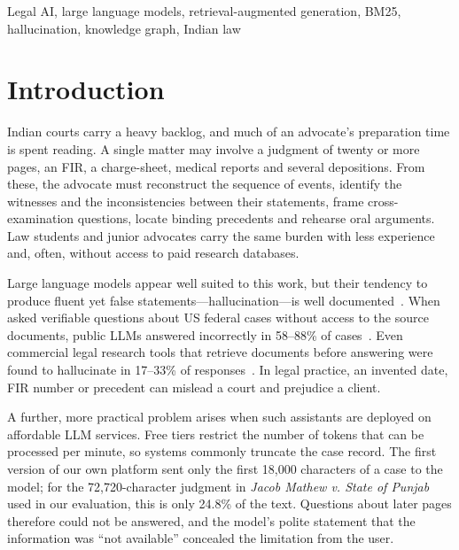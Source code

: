 \documentclass[conference]{IEEEtran}
\begin{document}
\begin{IEEEkeywords}
Legal AI, large language models, retrieval-augmented generation, BM25, hallucination, knowledge graph, Indian law
\end{IEEEkeywords}

\section{Introduction}
Indian courts carry a heavy backlog, and much of an advocate's preparation time is spent reading. A single matter may involve a judgment of twenty or more pages, an FIR, a charge-sheet, medical reports and several depositions. From these, the advocate must reconstruct the sequence of events, identify the witnesses and the inconsistencies between their statements, frame cross-examination questions, locate binding precedents and rehearse oral arguments. Law students and junior advocates carry the same burden with less experience and, often, without access to paid research databases.

Large language models appear well suited to this work, but their tendency to produce fluent yet false statements---hallucination---is well documented~\cite{ji2023survey}. When asked verifiable questions about US federal cases without access to the source documents, public LLMs answered incorrectly in 58--88\% of cases~\cite{dahl2024}. Even commercial legal research tools that retrieve documents before answering were found to hallucinate in 17--33\% of responses~\cite{magesh2025}. In legal practice, an invented date, FIR number or precedent can mislead a court and prejudice a client.

A further, more practical problem arises when such assistants are deployed on affordable LLM services. Free tiers restrict the number of tokens that can be processed per minute, so systems commonly truncate the case record. The first version of our own platform sent only the first 18,000 characters of a case to the model; for the 72,720-character judgment in \emph{Jacob Mathew v. State of Punjab}~\cite{jacobmathew2005} used in our evaluation, this is only 24.8\% of the text. Questions about later pages therefore could not be answered, and the model's polite statement that the information was ``not available'' concealed the limitation from the user.
\end{document}
